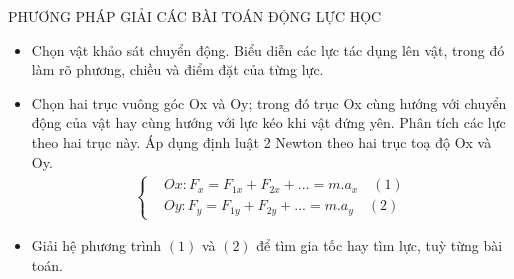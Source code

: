 \begin{dang}{PHƯƠNG PHÁP GIẢI CÁC BÀI TOÁN ĐỘNG LỰC HỌC}
\begin{itemize}
\item[1.] Chọn vật khảo sát chuyển động. Biểu diễn các lực tác dụng lên vật, trong đó làm rõ phương, chiều và điểm đặt của từng lực.
\item[2.] Chọn hai trục vuông góc Ox và Oy; trong đó trục Ox cùng hướng với chuyển động của vật hay cùng hướng với lực kéo khi vật đứng yên. Phân tích các lực theo hai trục này. Áp dụng định luật 2 Newton theo hai trục toạ độ Ox và Oy.
\begin{align*}
\begin{cases}
&Ox: F_x=F_{1x}+F_{2x}+...=m.a_x\quad (1)\\
&Oy:  F_y=F_{1y}+F_{2y}+...=m.a_y\quad (2)
\end{cases}
\end{align*}
\item[3.] Giải hệ phương trình $(1)$ và $(2)$ để tìm gia tốc hay tìm lực, tuỳ từng bài toán.
\end{itemize}
\end{dang}